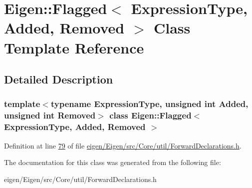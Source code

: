 \hypertarget{class_eigen_1_1_flagged}{}\section{Eigen\+:\+:Flagged$<$ Expression\+Type, Added, Removed $>$ Class Template Reference}
\label{class_eigen_1_1_flagged}


\subsection{Detailed Description}
\subsubsection*{template$<$typename Expression\+Type, unsigned int Added, unsigned int Removed$>$\newline
class Eigen\+::\+Flagged$<$ Expression\+Type, Added, Removed $>$}



Definition at line \hyperlink{eigen_2_eigen_2src_2_core_2util_2_forward_declarations_8h_source_l00079}{79} of file \hyperlink{eigen_2_eigen_2src_2_core_2util_2_forward_declarations_8h_source}{eigen/\+Eigen/src/\+Core/util/\+Forward\+Declarations.\+h}.



The documentation for this class was generated from the following file\+:\begin{DoxyCompactItemize}
\item 
eigen/\+Eigen/src/\+Core/util/\+Forward\+Declarations.\+h\end{DoxyCompactItemize}
